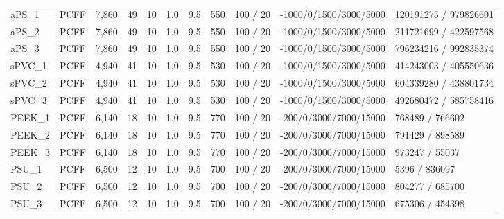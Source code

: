 \begin{longtable}{l l r r r r r r c l l}
aPS\_1 & PCFF & 7{,}860 & 49 & 10 & 1.0 & 9.5 & 550 & 100 / 20 & -1000/0/1500/3000/5000 & 120191275 / 979826601 \\
aPS\_2 & PCFF & 7{,}860 & 49 & 10 & 1.0 & 9.5 & 550 & 100 / 20 & -1000/0/1500/3000/5000 & 211721699 / 422597568 \\
aPS\_3 & PCFF & 7{,}860 & 49 & 10 & 1.0 & 9.5 & 550 & 100 / 20 & -1000/0/1500/3000/5000 & 796234216 / 992835374 \\
sPVC\_1 & PCFF & 4{,}940 & 41 & 10 & 1.0 & 9.5 & 530 & 100 / 20 & -1000/0/1500/3000/5000 & 414243003 / 405550636 \\
sPVC\_2 & PCFF & 4{,}940 & 41 & 10 & 1.0 & 9.5 & 530 & 100 / 20 & -1000/0/1500/3000/5000 & 604339280 / 438801734 \\
sPVC\_3 & PCFF & 4{,}940 & 41 & 10 & 1.0 & 9.5 & 530 & 100 / 20 & -1000/0/1500/3000/5000 & 492680472 / 585758416 \\
PEEK\_1 & PCFF & 6{,}140 & 18 & 10 & 1.0 & 9.5 & 770 & 100 / 20 & -200/0/3000/7000/15000 & 768489 / 766602 \\
PEEK\_2 & PCFF & 6{,}140 & 18 & 10 & 1.0 & 9.5 & 770 & 100 / 20 & -200/0/3000/7000/15000 & 791429 / 898589 \\
PEEK\_3 & PCFF & 6{,}140 & 18 & 10 & 1.0 & 9.5 & 770 & 100 / 20 & -200/0/3000/7000/15000 & 973247 / 55037 \\
PSU\_1 & PCFF & 6{,}500 & 12 & 10 & 1.0 & 9.5 & 700 & 100 / 20 & -200/0/3000/7000/15000 & 5396 / 836097 \\
PSU\_2 & PCFF & 6{,}500 & 12 & 10 & 1.0 & 9.5 & 700 & 100 / 20 & -200/0/3000/7000/15000 & 804277 / 685700 \\
PSU\_3 & PCFF & 6{,}500 & 12 & 10 & 1.0 & 9.5 & 700 & 100 / 20 & -200/0/3000/7000/15000 & 675306 / 454398 \\
\end{longtable}
\normalsize
